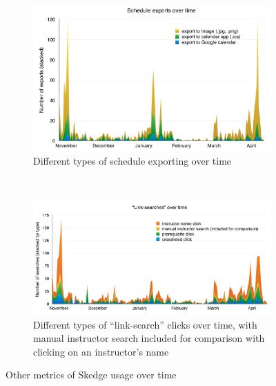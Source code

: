{\begin{figure}[H]
  \centering
    \begin{subfigure}[w]{14.5cm}
      \centering
      \includegraphics[width=1.00\textwidth]{images/graph/exports}
      \caption{Different types of schedule exporting over time} \label{fig:exports}
    \end{subfigure} \\

    \vspace{30pt}

    \begin{subfigure}[w]{14.5cm}
      \centering
      \includegraphics[width=1.00\textwidth]{images/graph/linksearches}
      \caption{Different types of ``link-search'' clicks over time, with manual instructor search included for comparison with clicking on an instructor's name} \label{fig:linksearches}
    \end{subfigure}

  \caption{Other metrics of Skedge usage over time}
\end{figure}

\clearpage

}
